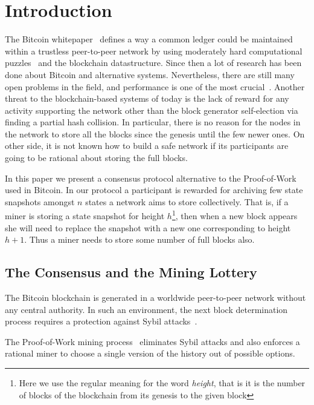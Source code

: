 \documentclass[conference,compsoc]{IEEEtran}
\begin{document}
\IEEEpeerreviewmaketitle

\section{Introduction}
\label{intr_section}

The Bitcoin whitepaper~\cite{Nakamoto2008} defines a way a common ledger could be maintained within a trustless peer-to-peer network by using moderately hard computational puzzles~\cite{milleranonymous} and the blockchain datastructure. Since then a lot of research has been done about Bitcoin and alternative systems. Nevertheless, there are still many open problems in the field, and performance is one of the most crucial~\cite{cromanscaling}. Another threat to the blockchain-based systems of today is the lack of reward for any activity supporting the network other than the block generator self-election via finding a partial hash collision. In particular, there is no reason for the nodes in the network to store all the blocks since the genesis until the few newer ones. On other side, it is not known how to build a safe network if its participants are going to be rational about storing the full blocks.

In this paper we present a consensus protocol alternative to the Proof-of-Work used in Bitcoin. In our protocol a participant is rewarded for archiving few state snapshots amongst \(n\) states a network aims to store collectively. That is, if a miner is storing a state snapshot for height \(h\)\footnote{Here we use the regular meaning for the word {\it height}, that is it is the number of blocks of the blockchain from its genesis to the given block}, then when a new block appears she will need to replace the snapshot with a new one corresponding to height \(h+1\). Thus a miner needs to store some number of full blocks also.


\subsection{The Consensus and the Mining Lottery}

The Bitcoin blockchain is generated in a worldwide peer-to-peer network without any central authority. In such an environment, the next block determination process requires a protection against Sybil attacks~\cite{douceur2002sybil}. 

The Proof-of-Work mining process~\cite{Nakamoto2008} eliminates Sybil attacks and also enforces a rational miner to choose a single version of the history out of possible options. 
\end{document}
